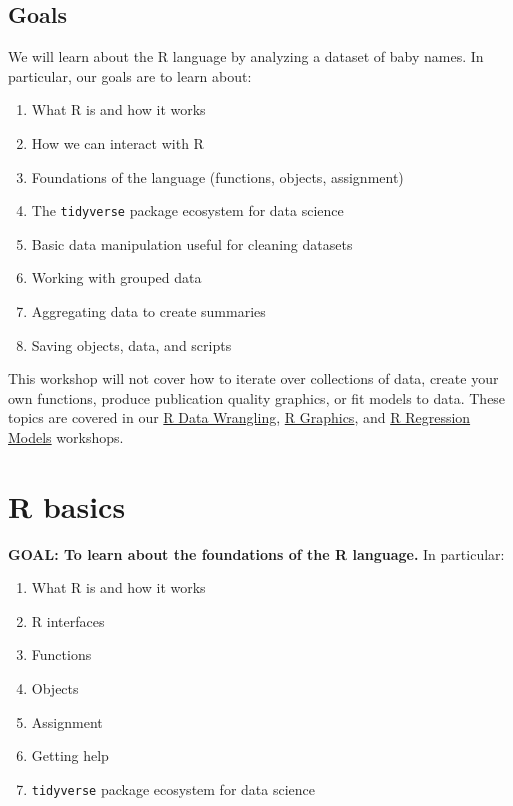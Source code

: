\documentclass[
]{book}
\providecommand{\tightlist}{%
  \setlength{\itemsep}{0pt}\setlength{\parskip}{0pt}}
\begin{document}
\hypertarget{goals}{%
\subsection{Goals}\label{goals}}

We will learn about the R language by analyzing a dataset of baby names.
In particular, our goals are to learn about:

\begin{enumerate}
\def\labelenumi{\arabic{enumi}.}
\tightlist
\item
  What R is and how it works
\item
  How we can interact with R
\item
  Foundations of the language (functions, objects, assignment)
\item
  The \texttt{tidyverse} package ecosystem for data science
\item
  Basic data manipulation useful for cleaning datasets
\item
  Working with grouped data
\item
  Aggregating data to create summaries
\item
  Saving objects, data, and scripts
\end{enumerate}

This workshop will not cover how to iterate over collections of data, create
your own functions, produce publication quality graphics, or fit models to data.
These topics are covered in our \href{./RDataWrangling.html}{R Data Wrangling},
\href{./Rgraphics.html}{R Graphics}, and \href{./Rmodels.html}{R Regression Models} workshops.

\hypertarget{r-basics}{%
\section{R basics}\label{r-basics}}

\textbf{GOAL: To learn about the foundations of the R language.} In particular:

\begin{enumerate}
\def\labelenumi{\arabic{enumi}.}
\tightlist
\item
  What R is and how it works
\item
  R interfaces
\item
  Functions
\item
  Objects
\item
  Assignment
\item
  Getting help
\item
  \texttt{tidyverse} package ecosystem for data science
\end{enumerate}
\end{document}

